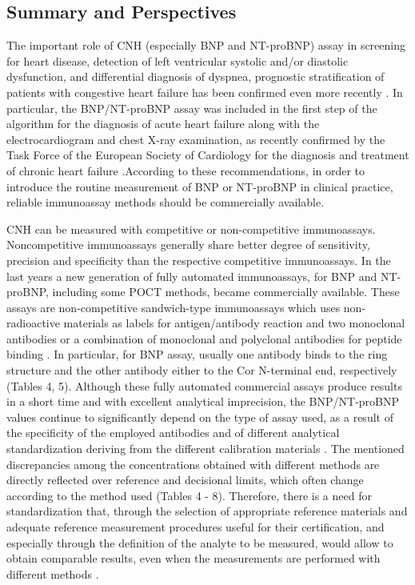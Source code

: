 \documentclass[14pt,a4paper,onecolumn]{extarticle}
\begin{document}
\subsection{ Summary and Perspectives}

The important role of CNH (especially BNP and NT-proBNP) assay in screening for
heart disease, detection of left ventricular systolic and/or diastolic dysfunction, and differential diagnosis of dyspnea, prognostic stratification of patients with congestive heart
failure has been confirmed even more recently \citep{bib24} \citep{bib287} \citep{bib288} \citep{bib2130} \citep{bib2131}. In particular, the
BNP/NT-proBNP assay was included in the first step of the algorithm for the diagnosis
of acute heart failure along with the electrocardiogram and chest X-ray examination,
as recently confirmed by the Task Force of the European Society of Cardiology for the diagnosis and treatment of chronic heart failure \citep{bib2132}.According to these recommendations,
in order to introduce the routine measurement of BNP or NT-proBNP in clinical practice, reliable immunoassay methods should be commercially available.

CNH can be measured with competitive or non-competitive immunoassays. Noncompetitive immunoassays generally share better degree of sensitivity, precision and
specificity than the respective competitive immunoassays. In the last years a new generation of fully automated immunoassays, for BNP and NT-proBNP, including some
POCT methods, became commercially available. These assays are non-competitive sandwich-type immunoassays which uses non-radioactive materials as labels for antigen/antibody reaction and two monoclonal antibodies or a combination of monoclonal and
polyclonal antibodies for peptide binding \citep{bib21} \citep{bib27} \citep{bib28} \citep{bib215} \citep{bib258} \citep{bib259} \citep{bib260} \citep{bib261} \citep{bib262} \citep{bib263} \citep{bib264}. In particular, for BNP assay,
usually one antibody binds to the ring structure and the other antibody either to the Cor N-terminal end, respectively (Tables 4, 5). Although these fully automated commercial assays produce results in a short time and with excellent analytical imprecision, the
BNP/NT-proBNP values continue to significantly depend on the type of assay used, as a
result of the specificity of the employed antibodies and of different analytical standardization deriving from the different calibration materials \citep{bib286} \citep{bib287} \citep{bib288}. The mentioned
discrepancies among the concentrations obtained with different methods are directly
reflected over reference and decisional limits, which often change according to the method
used \citep{bib262} \citep{bib287} \citep{bib288} (Tables 4 - 8). Therefore, there is a need for standardization that, through
the selection of appropriate reference materials and adequate reference measurement
procedures useful for their certification, and especially through the definition of the
analyte to be measured, would allow to obtain comparable results, even when the measurements are performed with different methods \citep{bib21} \citep{bib286} \citep{bib287} \citep{bib2288}.
\end{document}
